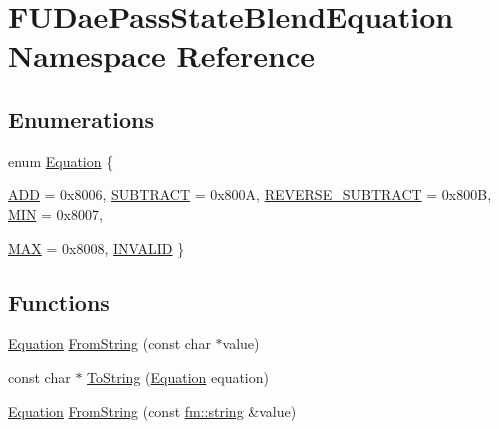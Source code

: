 \hypertarget{namespaceFUDaePassStateBlendEquation}{
\section{FUDaePassStateBlendEquation Namespace Reference}
\label{namespaceFUDaePassStateBlendEquation}
}
\subsection*{Enumerations}
\begin{DoxyCompactItemize}
\item 
enum \hyperlink{namespaceFUDaePassStateBlendEquation_ae93e86bb1bebea11494ca0085a6a6f4d}{Equation} \{ \par
\hyperlink{namespaceFUDaePassStateBlendEquation_ae93e86bb1bebea11494ca0085a6a6f4dab092c3ec69f13860f579508d0e47a330}{ADD} =  0x8006, 
\hyperlink{namespaceFUDaePassStateBlendEquation_ae93e86bb1bebea11494ca0085a6a6f4dabb495144c7ef77cb6ebc9807bc5361c2}{SUBTRACT} =  0x800A, 
\hyperlink{namespaceFUDaePassStateBlendEquation_ae93e86bb1bebea11494ca0085a6a6f4da49293419ee4f463e1356980b8b0562f6}{REVERSE\_\-SUBTRACT} =  0x800B, 
\hyperlink{namespaceFUDaePassStateBlendEquation_ae93e86bb1bebea11494ca0085a6a6f4da7e26fa0cea9f9dd487eadedf04db35f4}{MIN} =  0x8007, 
\par
\hyperlink{namespaceFUDaePassStateBlendEquation_ae93e86bb1bebea11494ca0085a6a6f4da365a78bf457ea908c012e87d39186f92}{MAX} =  0x8008, 
\hyperlink{namespaceFUDaePassStateBlendEquation_ae93e86bb1bebea11494ca0085a6a6f4dabb32ec52faa6b9bbcc9582069e877d3f}{INVALID}
 \}
\end{DoxyCompactItemize}
\subsection*{Functions}
\begin{DoxyCompactItemize}
\item 
\hyperlink{namespaceFUDaePassStateBlendEquation_ae93e86bb1bebea11494ca0085a6a6f4d}{Equation} \hyperlink{namespaceFUDaePassStateBlendEquation_a97fa7b5710db8fb055a1af79f1e3a550}{FromString} (const char $\ast$value)
\item 
const char $\ast$ \hyperlink{namespaceFUDaePassStateBlendEquation_a60dc55abbd20eda809e86265a727b151}{ToString} (\hyperlink{namespaceFUDaePassStateBlendEquation_ae93e86bb1bebea11494ca0085a6a6f4d}{Equation} equation)
\item 
\hyperlink{namespaceFUDaePassStateBlendEquation_ae93e86bb1bebea11494ca0085a6a6f4d}{Equation} \hyperlink{namespaceFUDaePassStateBlendEquation_ac1ff634a4c97213c7b57e6aef730cb2a}{FromString} (const \hyperlink{classfm_1_1stringT}{fm::string} \&value)
\end{DoxyCompactItemize}



